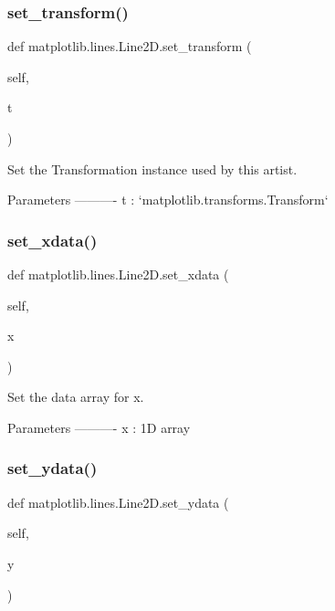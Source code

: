 \subsubsection{\texorpdfstring{set\+\_\+transform()}{set\_transform()}}
{\footnotesize\ttfamily def matplotlib.\+lines.\+Line2\+D.\+set\+\_\+transform (\begin{DoxyParamCaption}\item[{}]{self,  }\item[{}]{t }\end{DoxyParamCaption})}

\begin{DoxyVerb}Set the Transformation instance used by this artist.

Parameters
----------
t : `matplotlib.transforms.Transform`
\end{DoxyVerb}
 \mbox{\label{classmatplotlib_1_1lines_1_1Line2D_ab39bd70de2897d30064f1f05c2e90c6b}} 
\subsubsection{\texorpdfstring{set\+\_\+xdata()}{set\_xdata()}}
{\footnotesize\ttfamily def matplotlib.\+lines.\+Line2\+D.\+set\+\_\+xdata (\begin{DoxyParamCaption}\item[{}]{self,  }\item[{}]{x }\end{DoxyParamCaption})}

\begin{DoxyVerb}Set the data array for x.

Parameters
----------
x : 1D array
\end{DoxyVerb}
 \mbox{\label{classmatplotlib_1_1lines_1_1Line2D_a0ad377f17534ab1eab0a79f812dc64b5}} 
\subsubsection{\texorpdfstring{set\+\_\+ydata()}{set\_ydata()}}
{\footnotesize\ttfamily def matplotlib.\+lines.\+Line2\+D.\+set\+\_\+ydata (\begin{DoxyParamCaption}\item[{}]{self,  }\item[{}]{y }\end{DoxyParamCaption})}

